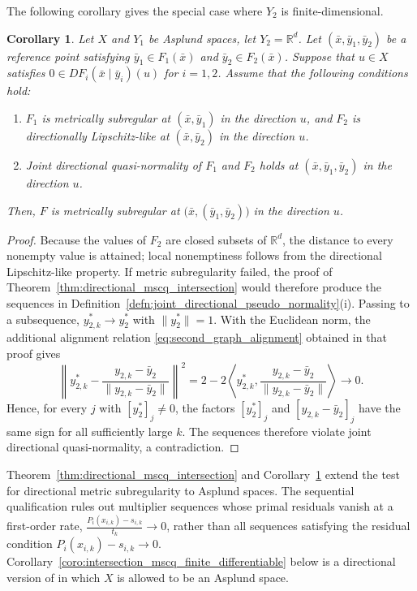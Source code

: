 \documentclass[12pt,twoside,reqno]{amsart}
\newtheorem{corollary}[theorem]{Corollary}
\theoremstyle{definition}
\numberwithin{equation}{section}
\begin{document}
The following corollary gives the special case where \(Y_2\) is
finite-dimensional.
\begin{corollary}\label{coro:directional_mscq_intersection_finite}
Let $X$ and $Y_1$ be Asplund spaces, let $Y_2=\mathbb R^d$. 
Let $(\bar{x}, \bar{y}_1, \bar{y}_2)$ be a reference point satisfying $\bar{y}_1 \in F_1(\bar{x})$ and $\bar{y}_2 \in F_2(\bar{x})$. Suppose that $u \in X$ satisfies \(0\in DF_i(\bar{x}\mid \bar{y}_i)(u)\) for $i=1,2$. Assume that the following conditions hold:

\begin{enumerate}
\item[(i)] $F_1$ is metrically subregular at $(\bar{x},\bar{y}_1)$ in the direction $u$, and $F_2$ is directionally Lipschitz-like at $(\bar{x}, \bar{y}_2)$ in the direction $u$.

\item[(ii)] Joint directional quasi-normality of $F_1$ and $F_2$ holds at $(\bar{x},\bar{y}_1,\bar{y}_2)$ in the direction $u$.
\end{enumerate}

Then, $F$ is metrically subregular at $\big(\bar{x}, (\bar{y}_1, \bar{y}_2)\big)$ in the direction $u$.  
\end{corollary}

\begin{proof}
Because the values of $F_2$ are closed subsets of $\mathbb R^d$, the distance to every nonempty value is attained; local nonemptiness follows from the directional Lipschitz-like property. If metric subregularity failed, the proof of Theorem~\ref{thm:directional_mscq_intersection} would therefore produce the sequences in Definition~\ref{defn:joint_directional_pseudo_normality}(i). Passing to a subsequence, $y_{2,k}^*\to y_2^*$ with $\|y_2^*\|=1$. With the Euclidean norm, the additional alignment relation \eqref{eq:second_graph_alignment} obtained in that proof gives
\[
    \left\|y_{2,k}^*-
    \frac{y_{2,k}-\bar{y}_2}{\|y_{2,k}-\bar{y}_2\|}\right\|^2
    =2-2\left\langle y_{2,k}^*,
    \frac{y_{2,k}-\bar{y}_2}{\|y_{2,k}-\bar{y}_2\|}\right\rangle\to0.
\]
Hence, for every $j$ with $[y_2^*]_j\ne0$, the factors $[y_2^*]_j$ and $[y_{2,k}-\bar{y}_2]_j$ have the same sign for all sufficiently large $k$. The sequences therefore violate joint directional quasi-normality, a contradiction.  
\end{proof}

Theorem~\ref{thm:directional_mscq_intersection} and Corollary~\ref{coro:directional_mscq_intersection_finite} extend the test for directional metric subregularity to Asplund spaces. The sequential qualification rules out multiplier sequences whose primal residuals vanish at a first-order rate, \(\frac{P_i(x_{i,k})-s_{i,k}}{t_k}\to 0\), rather than all sequences satisfying the residual condition \(P_i(x_{i,k})-s_{i,k}\to 0\). 
Corollary~\ref{coro:intersection_mscq_finite_differentiable} below is
a directional version of \cite[Theorem~2]{gfrerer2017new} in which
\(X\) is allowed to be an Asplund space.
\end{document}
